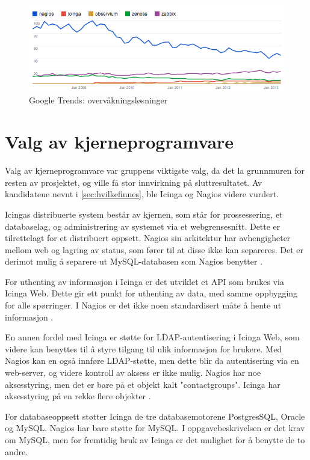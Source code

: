 \begin{figure}[H]
    \centering
    \includegraphics[scale=0.6]{img/monitoring_google_trends}
    \caption{Google Trends: overvåkningsløsninger}
    \label{losninger}
\end{figure}

\section{Valg av kjerneprogramvare}
Valg av kjerneprogramvare var gruppens viktigste valg, da det la grunnmuren for resten av prosjektet, og ville få stor innvirkning på sluttresultatet. Av kandidatene nevnt i \ref{sec:hvilkefinnes}, ble Icinga og Nagios videre vurdert.  

Icingas distribuerte system består av kjernen, som står for prossessering, et databaselag, og administrering av systemet via et webgrensesnitt. Dette er tilrettelagt for et distribuert oppsett. Nagios sin arkitektur har avhengigheter mellom web og lagring av status, som fører til at disse ikke kan separeres. Det er derimot mulig å separere ut MySQL-databasen som Nagios benytter \cite{icingaarchitecture}.

For uthenting av informasjon i Icinga er det utviklet et API som brukes via Icinga Web. Dette gir ett punkt for uthenting av data, med samme oppbygging for alle spørringer. I Nagios er det ikke noen standardisert måte å hente ut informasjon \cite{icingaapi}. 

En annen fordel med Icinga er støtte for LDAP-autentisering i Icinga Web, som videre kan benyttes til å styre tilgang til ulik informasjon for brukere. Med Nagios kan en også innføre LDAP-støtte, men dette blir da autentisering via en web-server, og videre kontroll av aksess er ikke mulig. Nagios har noe aksesstyring, men det er bare på et objekt kalt "contactgroups". Icinga har aksesstyring på en rekke flere objekter \cite{icingaweb}.

For databaseoppsett støtter Icinga de tre databasemotorene PostgresSQL, Oracle og MySQL. Nagios har bare støtte for MySQL. I oppgavebeskrivelsen er det krav om MySQL, men for fremtidig bruk av Icinga er det mulighet for å benytte de to andre.

